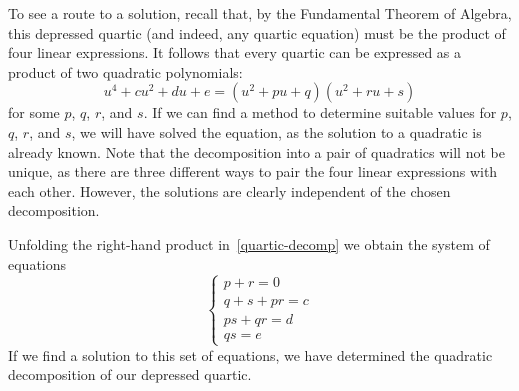 \documentclass{article} %
\theoremstyle{plain}
\theoremstyle{definition}
\begin{document}
To see a route to a solution,
recall that, by the Fundamental Theorem of Algebra,
this depressed quartic (and indeed, any quartic equation) must be the product of four linear expressions.
It follows that every quartic can be expressed
as a product of two quadratic polynomials:
\begin{equation}\label{quartic-decomp}
u^4 + cu^2 + du + e = (u^2 + pu + q)(u^2 + ru + s)
\end{equation}
for some $p$, $q$, $r$, and $s$.
If we can find a method to determine suitable values for $p$, $q$, $r$, and $s$, we will have solved the equation, as the solution to a quadratic is already known.
Note that the decomposition into a pair of quadratics will not be unique, as there are three different ways to pair the four linear expressions with each other.
However, the solutions are clearly independent of the chosen decomposition.

Unfolding the right-hand product in~\eqref{quartic-decomp}
we obtain the system of equations
\begin{equation}\label{quartic-system}
\begin{cases}
p + r = 0
\\
q + s + pr = c
\\
ps + qr = d
\\
qs = e
\end{cases}
\end{equation}
%
If we find a solution to this set of equations,
we have determined the quadratic decomposition of our depressed quartic.
\end{document}
